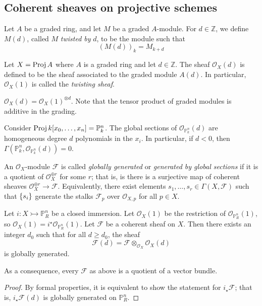 \subsection{Coherent sheaves on projective schemes}
\begin{definition}
    Let \( A \) be a graded ring, and let \( M \) be a graded \( A \)-module.
    For \( d \in \mathbb Z \), we define \( M(d) \), called \( M \) \emph{twisted by} \( d \), to be the module such that
    \[ (M(d))_k = M_{k+d} \]
\end{definition}
\begin{definition}
    Let \( X = \operatorname{Proj} A \) where \( A \) is a graded ring and let \( d \in \mathbb Z \).
    The sheaf \( \mathcal O_X(d) \) is defined to be the sheaf associated to the graded module \( A(d) \).
    In particular, \( \mathcal O_X(1) \) is called the \emph{twisting sheaf}.
\end{definition}
\begin{remark}
    \( \mathcal O_X(d) = \mathcal O_X(1)^{\otimes d} \).
    Note that the tensor product of graded modules is additive in the grading.
\end{remark}
\begin{example}
    Consider \( \operatorname{Proj} k[x_0, \dots, x_n] = \mathbb P^n_k \).
    The global sections of \( \mathcal O_{\mathbb P^n_k}(d) \) are homogeneous degree \( d \) polynomials in the \( x_i \).
    In particular, if \( d < 0 \), then \( \Gamma(\mathbb P^n_k, \mathcal O_{\mathbb P^n_k}(d)) = 0 \).
\end{example}
\begin{definition}
    An \( \mathcal O_X \)-module \( \mathcal F \) is called \emph{globally generated} or \emph{generated by global sections} if it is a quotient of \( \mathcal O_X^{\oplus r} \) for some \( r \); that is, is there is a surjective map of coherent sheaves \( \mathcal O_X^{\oplus r} \to \mathcal F \).
    Equivalently, there exist elements \( s_1, \dots, s_r \in \Gamma(X, \mathcal F) \) such that \( \qty{s_i} \) generate the stalks \( \mathcal F_p \) over \( \mathcal O_{X,p} \) for all \( p \in X \).
\end{definition}
\begin{theorem}
    Let \( i : X \rightarrowtail \mathbb P^n_R \) be a closed immersion.
    Let \( \mathcal O_X(1) \) be the restriction of \( \mathcal O_{\mathbb P^n_R}(1) \), so \( \mathcal O_X(1) = i^\star \mathcal O_{\mathbb P^n_R}(1) \).
    Let \( \mathcal F \) be a coherent sheaf on \( X \).
    Then there exists an integer \( d_0 \) such that for all \( d \geq d_0 \), the sheaf
    \[ \mathcal F(d) = \mathcal F \otimes_{\mathcal O_X} \mathcal O_X(d) \]
    is globally generated.
\end{theorem}
As a consequence, every \( \mathcal F \) as above is a quotient of a vector bundle.
\begin{proof}
    By formal properties, it is equivalent to show the statement for \( i_\star \mathcal F \); that is, \( i_\star \mathcal F(d) \) is globally generated on \( \mathbb P^n_R \).
\end{proof}
